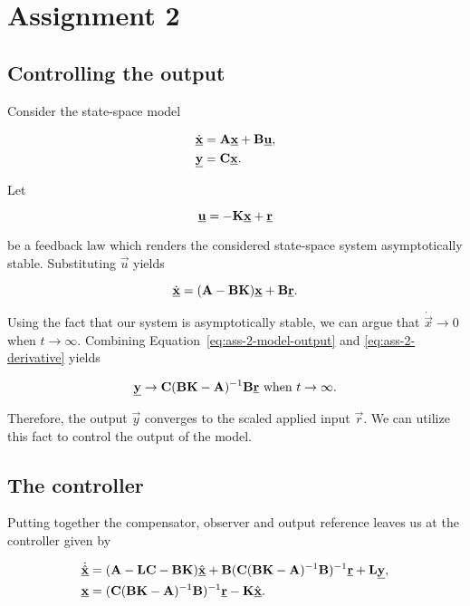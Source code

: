 \documentclass[11pt,titlepage]{report}
\begin{document}
\chapter{Assignment 2}
\section{Controlling the output}
Consider the state-space model

\begin{align}
	\dot{\mathbf{\underline{x}}} &= \mathbf{A}\mathbf{\underline{x}} + \mathbf{B}\mathbf{\underline{u}}, \\
	\mathbf{\underline{y}} &= \mathbf{C} \mathbf{\underline{x}}. \label{eq:ass-2-model-output}
\end{align}

Let

\begin{equation}
	\mathbf{\underline{u}} = -\mathbf{K}\mathbf{\underline{x}} + \mathbf{\underline{r}}
\end{equation}

be a feedback law which renders the considered state-space system asymptotically stable. Substituting $\vec{u}$ yields

\begin{equation} \label{eq:ass-2-derivative}
	\dot{\mathbf{\underline{x}}} = (\mathbf{A} - \mathbf{B} \mathbf{K}) \mathbf{\underline{x}} + \mathbf{B} \mathbf{\underline{r}}.
\end{equation}

Using the fact that our system is asymptotically stable, we can argue that $\dot{\vec{x}} \to 0$ when $t \to \infty$. Combining Equation~\ref{eq:ass-2-model-output} and \ref{eq:ass-2-derivative} yields

\begin{equation}
	\mathbf{\underline{y}} \to \mathbf{C} (\mathbf{B} \mathbf{K} - \mathbf{A})^{-1} \mathbf{B} \mathbf{\underline{r}} \text{ when } t \to \infty.
\end{equation}

Therefore, the output $\vec{y}$ converges to the scaled applied input $\vec{r}$. We can utilize this fact to control the output of the model.

\section{The controller}
Putting together the compensator, observer and output reference leaves us at the controller given by

\begin{align}
	\dot{\hat{\mathbf{\underline{x}}}} &= (\mathbf{A}-\mathbf{L}\mathbf{C}-\mathbf{B}\mathbf{K}) \hat{\mathbf{\underline{x}}} + \mathbf{B}(\mathbf{C}(\mathbf{B} \mathbf{K} - \mathbf{A})^{-1} \mathbf{B})^{-1} \mathbf{\underline{r}} + \mathbf{L} \mathbf{\underline{y}}, \\
	\mathbf{\underline{x}} &= (\mathbf{C}(\mathbf{B} \mathbf{K} - \mathbf{A})^{-1} \mathbf{B})^{-1} \mathbf{\underline{r}} - \mathbf{K} \hat{\mathbf{\underline{x}}}.
\end{align}
\end{document}
